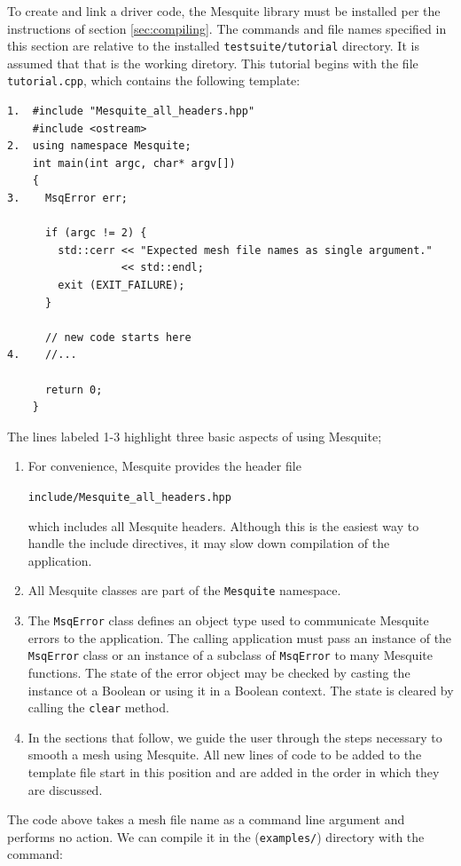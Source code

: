 To create and link a driver code, the Mesquite library must be
installed per the instructions of section \ref{sec:compiling}. 
The commands and file names specified in this section are relative 
to the installed \texttt{testsuite/tutorial} directory.  It 
is assumed that that is the working diretory.
This tutorial begins with the file \texttt{tutorial.cpp}, 
which contains the following template:
\begin{verbatim}
1.  #include "Mesquite_all_headers.hpp"
    #include <ostream>
2.  using namespace Mesquite;
    int main(int argc, char* argv[])
    {
3.    MsqError err;

      if (argc != 2) {
        std::cerr << "Expected mesh file names as single argument."
                  << std::endl;
        exit (EXIT_FAILURE);
      }

      // new code starts here
4.    //... 

      return 0;
    }
\end{verbatim}
The lines labeled 1-3 highlight three basic aspects of using Mesquite;
\begin{enumerate}
\item For convenience, Mesquite provides the header file
\begin{center}
\texttt{include/Mesquite\_all\_headers.hpp}
\end{center} which includes all Mesquite
headers. Although this is the easiest way to handle the include directives,
it may slow down compilation of the application.  
\item All Mesquite classes are part of the \texttt{Mesquite} namespace. 

\item  The \texttt{MsqError} class defines an object type used to communicate
Mesquite errors to the application.  The calling application must pass
an instance of the \texttt{MsqError} class or an instance of a subclass of
\texttt{MsqError} to many Mesquite functions.  The state of the error object
may be checked by casting the instance ot a Boolean or using it in a 
Boolean context.  The state is cleared by calling the \texttt{clear} method.
\item In the sections that follow, we guide the user through the steps
necessary to smooth a mesh using Mesquite.  All new lines of code to be
added to the template file start in this position and are added in the order
in which they are discussed.
\end{enumerate}

The code above takes a mesh file name as a command line argument and
performs no action. We can compile it in the 
(\texttt{examples/}) directory with the command:

